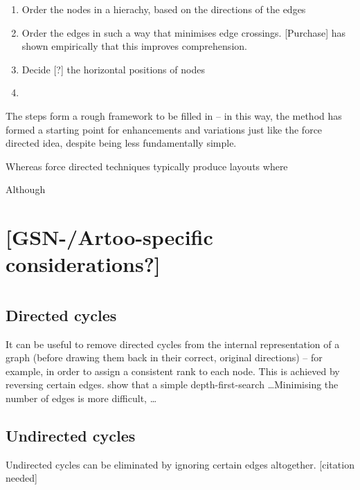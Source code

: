 \begin{enumerate}
\item Order the nodes in a hierachy, based on the directions of the edges
\item Order the edges in such a way that minimises edge crossings. [Purchase] has shown empirically that this improves comprehension.
\item Decide [?] the horizontal positions of nodes
\item
\end{enumerate}

The steps form a rough framework to be filled in -- in this way, the method has formed a starting point for enhancements and variations just like the force directed idea, despite being less fundamentally simple.

Whereas force directed techniques typically produce layouts where 


Although 



\section{[GSN-/Artoo-specific considerations?]}


\section{}




\subsection{Directed cycles}

It can be useful to remove directed cycles from the internal representation of a graph
(before drawing them back in their correct, original directions)
-- for example, in order to assign a consistent rank to each node.
This is achieved by reversing certain edges.
\citet{gansner1993} show that a simple depth-first-search \ldots  Minimising the number of edges is more difficult, \citeauthor{gansner1993} \ldots



\subsection{Undirected cycles}

Undirected cycles can be eliminated by ignoring certain edges altogether.  [citation needed]



